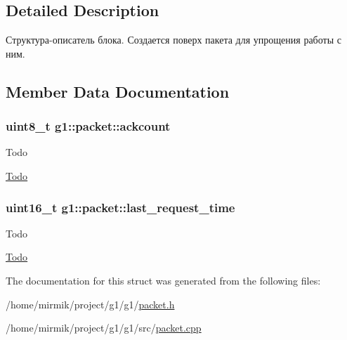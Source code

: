 \subsection{Detailed Description}
Структура-\/описатель блока. Создается поверх пакета для упрощения работы с ним. 

\subsection{Member Data Documentation}
\subsubsection[{\texorpdfstring{ackcount}{ackcount}}]{\setlength{\rightskip}{0pt plus 5cm}uint8\+\_\+t g1\+::packet\+::ackcount}\hypertarget{structg1_1_1packet_a18df7f0ed915a9b7901c73afce275f87}{}\label{structg1_1_1packet_a18df7f0ed915a9b7901c73afce275f87}
\begin{DoxyRefDesc}{Todo}
\item[\hyperlink{todo__todo000003}{Todo}]\end{DoxyRefDesc}
\subsubsection[{\texorpdfstring{last\+\_\+request\+\_\+time}{last_request_time}}]{\setlength{\rightskip}{0pt plus 5cm}uint16\+\_\+t g1\+::packet\+::last\+\_\+request\+\_\+time}\hypertarget{structg1_1_1packet_adeb6ae81faca9970d09c848a793d2a9f}{}\label{structg1_1_1packet_adeb6ae81faca9970d09c848a793d2a9f}
\begin{DoxyRefDesc}{Todo}
\item[\hyperlink{todo__todo000002}{Todo}]\end{DoxyRefDesc}


The documentation for this struct was generated from the following files\+:\begin{DoxyCompactItemize}
\item 
/home/mirmik/project/g1/g1/\hyperlink{packet_8h}{packet.\+h}\item 
/home/mirmik/project/g1/g1/src/\hyperlink{packet_8cpp}{packet.\+cpp}\end{DoxyCompactItemize}
